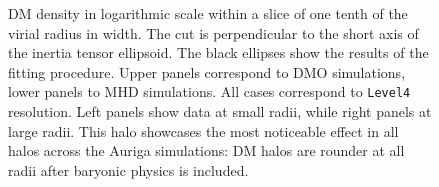 \documentclass[usenatbib]{mnras}
\begin{document}
\begin{figure}
  \hfill
  \hfill 
  \caption{DM density in logarithmic scale within a slice of one tenth
    of the virial radius in width. 
    The cut is perpendicular to the short axis of the inertia tensor ellipsoid.
    The black ellipses show the results of the fitting procedure. 
    Upper panels correspond to DMO simulations, lower panels to MHD
    simulations.
    All cases correspond to \texttt{Level4} resolution.
    Left panels show data at small radii, while right panels at large
    radii.    
    This halo showcases the most noticeable effect in all halos
    across the Auriga simulations: DM halos are rounder at all radii
    after baryonic physics is included.}
\label{fig:slices}
\end{figure}
\end{document}
